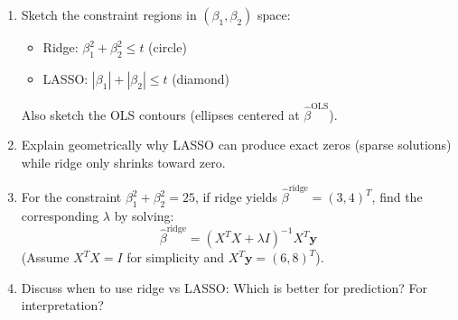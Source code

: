 \documentclass[12pt]{article}
\begin{document}
\begin{enumerate}[label=(\alph*)]
\item Sketch the constraint regions in \((\beta_1, \beta_2)\) space:
\begin{itemize}
\item Ridge: \(\beta_1^2 + \beta_2^2 \leq t\) (circle)
\item LASSO: \(|\beta_1| + |\beta_2| \leq t\) (diamond)
\end{itemize}
Also sketch the OLS contours (ellipses centered at \(\hat{\beta}^{\text{OLS}}\)).

\item Explain geometrically why LASSO can produce exact zeros (sparse solutions) while ridge only shrinks toward zero.

\item For the constraint \(\beta_1^2 + \beta_2^2 = 25\), if ridge yields \(\hat{\beta}^{\text{ridge}} = (3, 4)^T\), find the corresponding \(\lambda\) by solving:
\[
\hat{\beta}^{\text{ridge}} = (X^TX + \lambda I)^{-1}X^T\mathbf{y}
\]
(Assume \(X^TX = I\) for simplicity and \(X^T\mathbf{y} = (6, 8)^T\)).

\item Discuss when to use ridge vs LASSO: Which is better for prediction? For interpretation?
\end{enumerate}
\end{document}
